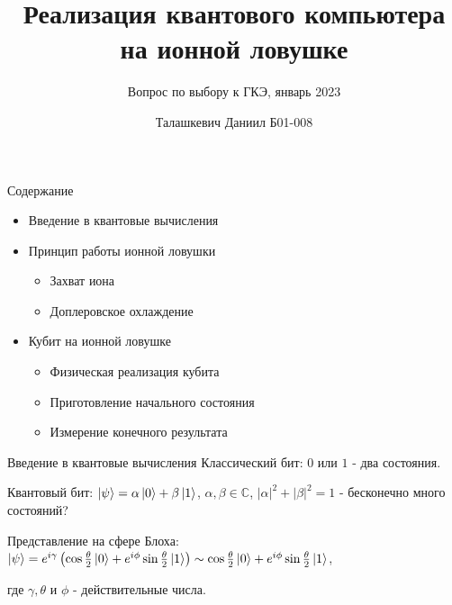 \documentclass{beamer}
\title{Реализация квантового компьютера на ионной ловушке}
\subtitle{Вопрос по выбору к ГКЭ, январь 2023}
\author{Талашкевич Даниил Б01-008}
\institute{Московский физико-технический институт}
\date{}
\begin{document}
    
    \begin{frame}
        \titlepage
    \end{frame}

    \begin{frame}{Содержание}

        \begin{itemize}

            \item Введение в квантовые вычисления
            
            \item Принцип работы ионной ловушки

                \begin{itemize}
                    \item{Захват иона}
                    \item{Доплеровское охлаждение}
                \end{itemize}

            \item Кубит на ионной ловушке

                \begin{itemize}
                    \item{Физическая реализация кубита}
                    \item{Приготовление начального состояния}
                    \item{Измерение конечного результата}
                \end{itemize}
      
        \end{itemize}            
        \end{frame}
	
	\begin{frame}{Введение в квантовые вычисления}
		Классический бит: $0$ или $1$ - два состояния.
		\vspace{3mm}
		
		Квантовый бит: $\ket{\psi} = \alpha\ket{0} + \beta\ket{1}$, $\alpha,\beta \in \mathbb{C}$, $|\alpha|^2 + |\beta|^2 = 1$ - бесконечно много состояний?
		\vspace{3mm}
		
		Представление на сфере Блоха: $\ket{\psi} = e^{i\gamma}\left(  \cos{\frac{\theta}{2}}\ket{0}+e^{i\phi}\sin{\frac{\theta}{2}} \ket{1}  \right) \sim \cos{\frac{\theta}{2}}\ket{0}+e^{i\phi}\sin{\frac{\theta}{2}} \ket{1} $,
		
		где $\gamma, \theta$ и $\phi$ - действительные числа.
	\end{frame}
	
\end{document}
